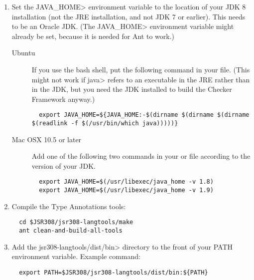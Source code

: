 \begin{enumerate}
\item
Set the \<JAVA\_HOME> environment variable to the location of your JDK
8 installation (not the JRE installation, and not JDK 7 or earlier).
This needs to be an Oracle JDK.
(The \<JAVA\_HOME> environment
variable might already be set, because it is needed for Ant to work.)

\begin{description}
\item[Ubuntu]
If you use the bash shell, put the following command in your
 file.  (This might not work if \<java> refers to an executable
in the JRE rather than in the JDK, but you need the JDK installed to build
the Checker Framework anyway.)
\begin{smaller}
\begin{Verbatim}
  export JAVA_HOME=${JAVA_HOME:-$(dirname $(dirname $(dirname $(readlink -f $(/usr/bin/which java)))))}
\end{Verbatim}
\end{smaller}

\item[Mac OSX 10.5 or later]
  Add one of the following two commands in your  or
   file according to the version of your JDK.
\begin{Verbatim}
  export JAVA_HOME=$(/usr/libexec/java_home -v 1.8)
  export JAVA_HOME=$(/usr/libexec/java_home -v 1.9)
\end{Verbatim}

\end{description}

\item
Compile the Type Annotations tools:

\begin{Verbatim}
  cd $JSR308/jsr308-langtools/make
  ant clean-and-build-all-tools
\end{Verbatim}

\item
 Add the \<jsr308-langtools/dist/bin> directory to the front of your PATH environment variable.
  Example command:

\begin{Verbatim}
  export PATH=$JSR308/jsr308-langtools/dist/bin:${PATH}
\end{Verbatim}

\end{enumerate}

